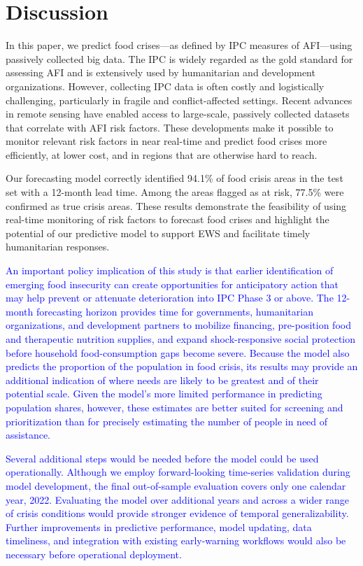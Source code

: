 \documentclass[pdflatex,sn-mathphys-num]{sn-jnl}%
\theoremstyle{thmstyleone}%
\theoremstyle{thmstyletwo}%
\theoremstyle{thmstylethree}%
\begin{document}
\section*{Discussion}
In this paper, we predict food crises—as defined by IPC measures of AFI—using passively collected big data. The IPC is widely regarded as the gold standard for assessing AFI and is extensively used by humanitarian and development organizations. However, collecting IPC data is often costly and logistically challenging, particularly in fragile and conflict-affected settings. Recent advances in remote sensing have enabled access to large-scale, passively collected datasets that correlate with AFI risk factors. These developments make it possible to monitor relevant risk factors in near real-time and predict food crises more efficiently, at lower cost, and in regions that are otherwise hard to reach.

Our forecasting model correctly identified  94.1\% of food crisis areas in the test set with a  12-month lead time. Among the areas flagged as at risk, 77.5\% were confirmed as true crisis areas. These results demonstrate the feasibility of using real-time monitoring of risk factors to forecast food crises and highlight the potential of our predictive model to support EWS and facilitate timely humanitarian responses.

\textcolor{blue}{An important policy implication of this study is that earlier identification of emerging food insecurity can create opportunities for anticipatory action that may help prevent or attenuate deterioration into IPC Phase 3 or above. The 12-month forecasting horizon provides time for governments, humanitarian organizations, and development partners to mobilize financing, pre-position food and therapeutic nutrition supplies, and expand shock-responsive social protection before household food-consumption gaps become severe. Because the model also predicts the proportion of the population in food crisis, its results may provide an additional indication of where needs are likely to be greatest and of their potential scale. Given the model’s more limited performance in predicting population shares, however, these estimates are better suited for screening and prioritization than for precisely estimating the number of people in need of assistance.}

\textcolor{blue}{Several additional steps would be needed before the model could be used operationally. Although we employ forward-looking time-series validation during model development, the final out-of-sample evaluation covers only one calendar year, 2022. Evaluating the model over additional years and across a wider range of crisis conditions would provide stronger evidence of temporal generalizability. Further improvements in predictive performance, model updating, data timeliness, and integration with existing early-warning workflows would also be necessary before operational deployment.}
\end{document}
